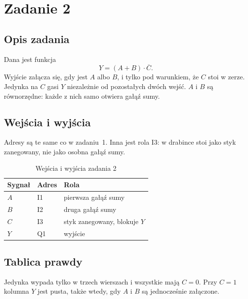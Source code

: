 \newpage
\section{Zadanie 2}

\subsection{Opis zadania}

Dana jest funkcja
\[
Y = (A + B) \cdot \overline{C}.
\]
Wyjście załącza się, gdy jest $A$ albo $B$, i tylko pod warunkiem, że $C$ stoi w zerze. Jedynka na $C$ gasi $Y$ niezależnie od pozostałych dwóch wejść. $A$ i $B$ są równorzędne: każde z nich samo otwiera gałąź sumy.

\subsection{Wejścia i wyjścia}

Adresy są te same co w zadaniu~1. Inna jest rola I3: w drabince stoi jako styk zanegowany, nie jako osobna gałąź sumy.

\begin{table}[H]
    \centering
    \caption{Wejścia i wyjścia zadania 2}
    \label{tab:z2-io}
    \begin{tabular}{|l|l|p{8.2cm}|}
        \hline
        \textbf{Sygnał} & \textbf{Adres} & \textbf{Rola} \\
        \hline
        $A$ & I1 & pierwsza gałąź sumy \\
        \hline
        $B$ & I2 & druga gałąź sumy \\
        \hline
        $C$ & I3 & styk zanegowany, blokuje $Y$ \\
        \hline
        $Y$ & Q1 & wyjście \\
        \hline
    \end{tabular}
\end{table}

\subsection{Tablica prawdy}

Jedynka wypada tylko w trzech wierszach i wszystkie mają $C = 0$. Przy $C = 1$ kolumna $Y$ jest pusta, także wtedy, gdy $A$ i $B$ są jednocześnie załączone.

